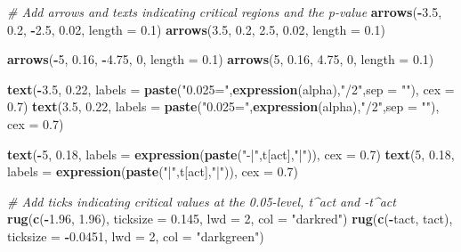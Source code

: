 \documentclass[]{book}
\newenvironment{Shaded}{\begin{snugshade}}{\end{snugshade}}
\newcommand{\KeywordTok}[1]{\textcolor[rgb]{0.13,0.29,0.53}{\textbf{#1}}}
\newcommand{\DataTypeTok}[1]{\textcolor[rgb]{0.13,0.29,0.53}{#1}}
\newcommand{\DecValTok}[1]{\textcolor[rgb]{0.00,0.00,0.81}{#1}}
\newcommand{\FloatTok}[1]{\textcolor[rgb]{0.00,0.00,0.81}{#1}}
\newcommand{\StringTok}[1]{\textcolor[rgb]{0.31,0.60,0.02}{#1}}
\newcommand{\CommentTok}[1]{\textcolor[rgb]{0.56,0.35,0.01}{\textit{#1}}}
\newcommand{\OperatorTok}[1]{\textcolor[rgb]{0.81,0.36,0.00}{\textbf{#1}}}
\newcommand{\NormalTok}[1]{#1}
\theoremstyle{definition}
\theoremstyle{definition}
\theoremstyle{definition}
\theoremstyle{remark}
\begin{document}
\begin{Shaded}
\begin{Highlighting}[]
\CommentTok{# Add arrows and texts indicating critical regions and the p-value}
\KeywordTok{arrows}\NormalTok{(}\OperatorTok{-}\FloatTok{3.5}\NormalTok{, }\FloatTok{0.2}\NormalTok{, }\OperatorTok{-}\FloatTok{2.5}\NormalTok{, }\FloatTok{0.02}\NormalTok{, }\DataTypeTok{length =} \FloatTok{0.1}\NormalTok{)}
\KeywordTok{arrows}\NormalTok{(}\FloatTok{3.5}\NormalTok{, }\FloatTok{0.2}\NormalTok{, }\FloatTok{2.5}\NormalTok{, }\FloatTok{0.02}\NormalTok{, }\DataTypeTok{length =} \FloatTok{0.1}\NormalTok{)}

\KeywordTok{arrows}\NormalTok{(}\OperatorTok{-}\DecValTok{5}\NormalTok{, }\FloatTok{0.16}\NormalTok{, }\OperatorTok{-}\FloatTok{4.75}\NormalTok{, }\DecValTok{0}\NormalTok{, }\DataTypeTok{length =} \FloatTok{0.1}\NormalTok{)}
\KeywordTok{arrows}\NormalTok{(}\DecValTok{5}\NormalTok{, }\FloatTok{0.16}\NormalTok{, }\FloatTok{4.75}\NormalTok{, }\DecValTok{0}\NormalTok{, }\DataTypeTok{length =} \FloatTok{0.1}\NormalTok{)}

\KeywordTok{text}\NormalTok{(}\OperatorTok{-}\FloatTok{3.5}\NormalTok{, }\FloatTok{0.22}\NormalTok{, }\DataTypeTok{labels =} \KeywordTok{paste}\NormalTok{(}\StringTok{"0.025="}\NormalTok{,}\KeywordTok{expression}\NormalTok{(alpha),}\StringTok{"/2"}\NormalTok{,}\DataTypeTok{sep =} \StringTok{""}\NormalTok{), }\DataTypeTok{cex =} \FloatTok{0.7}\NormalTok{)}
\KeywordTok{text}\NormalTok{(}\FloatTok{3.5}\NormalTok{, }\FloatTok{0.22}\NormalTok{, }\DataTypeTok{labels =} \KeywordTok{paste}\NormalTok{(}\StringTok{"0.025="}\NormalTok{,}\KeywordTok{expression}\NormalTok{(alpha),}\StringTok{"/2"}\NormalTok{,}\DataTypeTok{sep =} \StringTok{""}\NormalTok{), }\DataTypeTok{cex =} \FloatTok{0.7}\NormalTok{)}

\KeywordTok{text}\NormalTok{(}\OperatorTok{-}\DecValTok{5}\NormalTok{, }\FloatTok{0.18}\NormalTok{, }\DataTypeTok{labels =} \KeywordTok{expression}\NormalTok{(}\KeywordTok{paste}\NormalTok{(}\StringTok{"-|"}\NormalTok{,t[act],}\StringTok{"|"}\NormalTok{)), }\DataTypeTok{cex =} \FloatTok{0.7}\NormalTok{)}
\KeywordTok{text}\NormalTok{(}\DecValTok{5}\NormalTok{, }\FloatTok{0.18}\NormalTok{, }\DataTypeTok{labels =} \KeywordTok{expression}\NormalTok{(}\KeywordTok{paste}\NormalTok{(}\StringTok{"|"}\NormalTok{,t[act],}\StringTok{"|"}\NormalTok{)), }\DataTypeTok{cex =} \FloatTok{0.7}\NormalTok{)}

\CommentTok{# Add ticks indicating critical values at the 0.05-level, t^act and -t^act }
\KeywordTok{rug}\NormalTok{(}\KeywordTok{c}\NormalTok{(}\OperatorTok{-}\FloatTok{1.96}\NormalTok{, }\FloatTok{1.96}\NormalTok{), }\DataTypeTok{ticksize  =} \FloatTok{0.145}\NormalTok{, }\DataTypeTok{lwd =} \DecValTok{2}\NormalTok{, }\DataTypeTok{col =} \StringTok{"darkred"}\NormalTok{)}
\KeywordTok{rug}\NormalTok{(}\KeywordTok{c}\NormalTok{(}\OperatorTok{-}\NormalTok{tact, tact), }\DataTypeTok{ticksize  =} \OperatorTok{-}\FloatTok{0.0451}\NormalTok{, }\DataTypeTok{lwd =} \DecValTok{2}\NormalTok{, }\DataTypeTok{col =} \StringTok{"darkgreen"}\NormalTok{)}
\end{Highlighting}
\end{Shaded}
\end{document}
